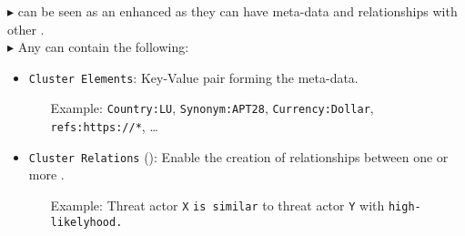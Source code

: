 \begin{multicols*}{3}
        {}

        {
            $\blacktriangleright$ \clusters can be seen as an enhanced \taxonomy as they can have meta-data and relationships with other \clusters.\\
            $\blacktriangleright$ Any \clusters can contain the following:
            \begin{itemize}[noitemsep,topsep=2pt,parsep=0pt,partopsep=0pt]
                \item \texttt{Cluster Elements}: Key-Value pair forming the meta-data.
                \begin{itemize}[noitemsep,topsep=2pt,parsep=0pt,partopsep=0pt]
                    \item[Example:] \texttt{Country:LU}, \texttt{Synonym:APT28}, \texttt{Currency:Dollar}, \texttt{refs:https://*}, …
                \end{itemize}
                \item \texttt{Cluster Relations} (\taggable\synchronisable\distributable): Enable the creation of relationships between one or more \clusters.
                \begin{itemize}[noitemsep,topsep=2pt,parsep=0pt,partopsep=0pt]
                    \item[Example:] Threat actor \texttt{X} \texttt{is similar} to threat actor \texttt{Y} with \texttt{high-likelyhood.}
                \end{itemize}
            \end{itemize}
        }
\end{multicols*}